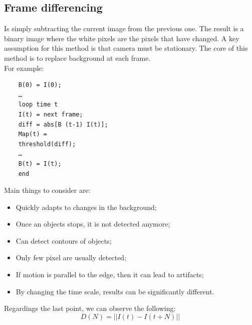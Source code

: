 \subsection{Frame differencing}
Is simply subtracting the current image from the previous one. The result is a binary image where the white pixels are the pixels that have changed. A key assumption for this method is that camera must be stationary. The core of this method is to replace background at each frame.
\\For example:
\begin{verbatim}
    B(0) = I(0);
    …
    loop time t
    I(t) = next frame;
    diff = abs[B (t-1) I(t)];
    Map(t) =
    threshold(diff);
    …
    B(t) = I(t);
    end
\end{verbatim} 
Main things to consider are:
\begin{itemize}
    \item Quickly adapts to changes in the background;
    \item Once an objects stops, it is not detected anymore;
    \item Can detect contours of objects;
    \item Only few pixel are usually detected;
    \item If motion is parallel to the edge, then it can lead to artifacts;
    \item By changing the time scale, results can be significantly different.
\end{itemize}
Regardings the last point, we can observe the following:
\[D(N) = ||I(t)-I(t+N)||\]

